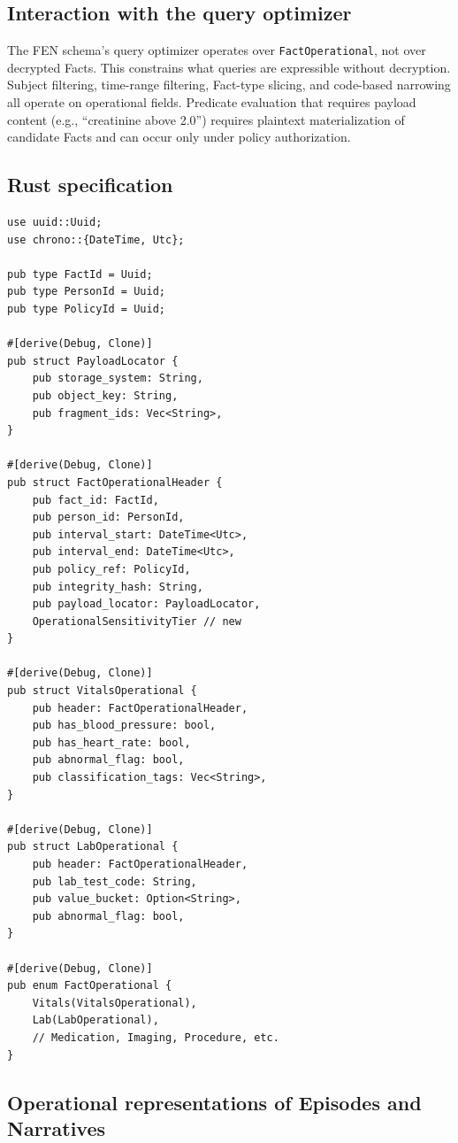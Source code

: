 \documentclass[11pt]{article}
\begin{document}
\subsection{Interaction with the query optimizer}

The FEN schema's query optimizer
operates over \texttt{FactOperational}, not over decrypted Facts. This
constrains what queries are expressible without decryption. Subject
filtering, time-range filtering, Fact-type slicing, and code-based
narrowing all operate on operational fields. Predicate evaluation that
requires payload content (e.g., ``creatinine above 2.0'') requires
plaintext materialization of candidate Facts and can occur only under
policy authorization.

\subsection{Rust specification}

\begin{verbatim}
use uuid::Uuid;
use chrono::{DateTime, Utc};

pub type FactId = Uuid;
pub type PersonId = Uuid;
pub type PolicyId = Uuid;

#[derive(Debug, Clone)]
pub struct PayloadLocator {
    pub storage_system: String,
    pub object_key: String,
    pub fragment_ids: Vec<String>,
}

#[derive(Debug, Clone)]
pub struct FactOperationalHeader {
    pub fact_id: FactId,
    pub person_id: PersonId,
    pub interval_start: DateTime<Utc>,
    pub interval_end: DateTime<Utc>,
    pub policy_ref: PolicyId,
    pub integrity_hash: String,
    pub payload_locator: PayloadLocator,
    OperationalSensitivityTier // new
}

#[derive(Debug, Clone)]
pub struct VitalsOperational {
    pub header: FactOperationalHeader,
    pub has_blood_pressure: bool,
    pub has_heart_rate: bool,
    pub abnormal_flag: bool,
    pub classification_tags: Vec<String>,
}

#[derive(Debug, Clone)]
pub struct LabOperational {
    pub header: FactOperationalHeader,
    pub lab_test_code: String,
    pub value_bucket: Option<String>,
    pub abnormal_flag: bool,
}

#[derive(Debug, Clone)]
pub enum FactOperational {
    Vitals(VitalsOperational),
    Lab(LabOperational),
    // Medication, Imaging, Procedure, etc.
}
\end{verbatim}

\subsection{Operational representations of Episodes and Narratives}
\end{document}
